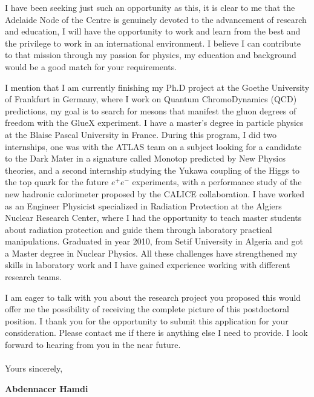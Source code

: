 \documentclass[11pt]{letter}
\begin{document}
I have been seeking just such an opportunity as this, it is clear to me that the Adelaide Node of the Centre is genuinely devoted to the advancement of research and education, I will have the opportunity to work and learn from the best and the privilege to work in an international environment. I believe I can contribute to that mission through my passion for physics, my education and background would be a good match for your requirements.
~\par I mention that I am currently finishing my Ph.D project at the Goethe University of Frankfurt in Germany, where I work on Quantum ChromoDynamics (QCD) predictions, my goal is to search for mesons that manifest the gluon degrees of freedom with the GlueX experiment. I have a master's degree in particle physics at the Blaise Pascal University in France. During this program, I did two internships, one was with the ATLAS team on a subject looking for a candidate to the Dark Mater in a signature called Monotop predicted by New Physics theories, and a second internship studying the Yukawa coupling of the Higgs to the top quark for the future $e^{+}e^{-}$ experiments, with a performance study of the new hadronic calorimeter proposed by the CALICE collaboration. I have worked as an Engineer Physicist specialized in Radiation Protection at the Algiers Nuclear Research Center, where I had the opportunity to teach master students about radiation protection and guide them through laboratory practical manipulations. Graduated in year 2010, from Setif University in Algeria and got a Master degree in Nuclear Physics.
All these challenges have strengthened my skills in laboratory work and I have gained experience working with different research teams.
~\par I am eager to talk with you about the research project you proposed this would offer me the possibility of receiving the complete picture of this postdoctoral position. I thank you for the opportunity to submit this application for your consideration. Please contact me if there is anything else I need to provide. I look forward to hearing from you in the near future.\\\\
Yours sincerely,

\begin{flushleft}
 {\bfseries Abdennacer Hamdi}
 \end{flushleft}
 \vfill
 
\end{document}
